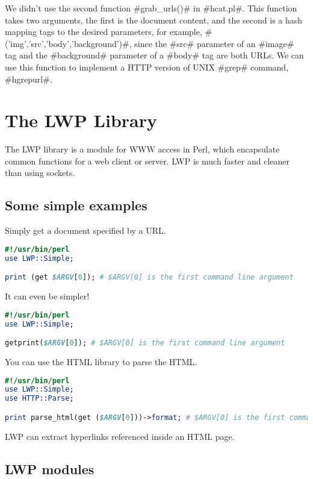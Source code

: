 \documentclass[a4paper]{article}
\begin{document}
We didn't use the second function #grab_urls()# in #hcat.pl#.
This function takes two arguments, the first is the document content,
and the second is a hash mapping tags to the desired parameters,
for example, #('img','src','body','background')#,
since the #src# parameter of an #image# tag and the #background# parameter of a #body# tag are both URLs.
We can use this function to implement a HTTP version of UNIX #grep# command, #hgrepurl#.


\section{The LWP Library}

The LWP library is a module for WWW access in Perl,
which encapsulate common functions for a web client or server.
LWP is much faster and cleaner than using sockets.

\subsection{Some simple examples}

Simply get a document specified by a URL.
\begin{lstlisting}[language=Perl]
#!/usr/bin/perl
use LWP::Simple;

print (get $ARGV[0]); # $ARGV[0] is the first command line argument
\end{lstlisting}

It can even be simpler!
\begin{lstlisting}[language=Perl]
#!/usr/bin/perl
use LWP::Simple;

getprint($ARGV[0]); # $ARGV[0] is the first command line argument
\end{lstlisting}

You can use the HTML library to parse the HTML.
\begin{lstlisting}[language=Perl]
#!/usr/bin/perl
use LWP::Simple;
use HTTP::Parse;

print parse_html(get ($ARGV[0]))->format; # $ARGV[0] is the first command line argument
\end{lstlisting}

LWP can extract hyperlinks referenced inside an HTML page.



\subsection{LWP modules}
\end{document}
